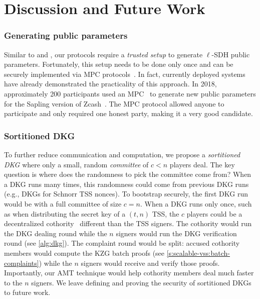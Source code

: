 \section{Discussion and Future Work}
\label{s:discussion}

\subsubsection{Generating public parameters}
\label{s:trusted-setup}
Similar to \evss and \ejfdkg, our protocols require a \textit{trusted setup} to generate $\ell$-SDH public parameters.
Fortunately, this setup needs to be done only once and can be securely implemented via MPC protocols~\cite{zcash-mpc1,zcash-mpc2}.
In fact, currently deployed systems have already demonstrated the practicality of this approach.
In 2018, approximately 200 participants used an MPC~\cite{zcash-mpc2} to generate new public parameters for the Sapling version of Zcash~\cite{zcash}.
The MPC protocol allowed anyone to participate and only required one honest party, making it a very good candidate.

\subsubsection{Sortitioned DKG}
\label{s:sortitioned-dkg}
To further reduce communication and computation, we propose a \textit{sortitioned DKG} where only a small, random \textit{committee} of $c < n$ players deal.
The key question is where does the randomness to pick the committee come from?
When a DKG runs many times, this randomness could come from previous DKG runs (e.g., DKGs for Schnorr TSS nonces).
To bootstrap securely, the first DKG run would be with a full committee of size $c=n$.
When a DKG runs only once, such as when distributing the secret key of a $(t,n)$ TSS, the $c$ players could be a decentralized cothority~\cite{cosi} different than the TSS signers.
The cothority would run the DKG dealing round while the $n$ signers would run the DKG verification round (see \cref{alg:dkg}).
The complaint round would be split: accused cothority members would compute the KZG batch proofs (see \cref{s:scalable-vss:batch-complaints}) while the $n$ signers would receive and verify those proofs.
Importantly, our AMT technique would help cothority members deal much faster to the $n$ signers.
We leave defining and proving the security of sortitioned DKGs to future work.

